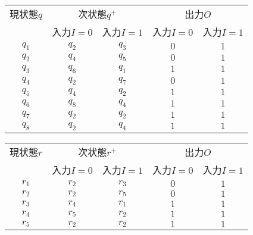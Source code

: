 \documentclass{jsarticle}
\begin{document}
\begin{tabular}{c|c|c||c|c}
\hline
現状態$q$  & \multicolumn{2}{c||}{次状態$q^{+}$} & \multicolumn{2}{c}{出力$O$} \\
\cline{2-5}  
   & 入力$I=0$ & 入力$I=1$ & 入力$I=0$ & 入力$I=1$\\
\hline
$q_{1}$ & $q_{2}$ & $q_{3}$ & $0$ & $1$ \\
$q_{2}$ & $q_{4}$ & $q_{5}$ & $0$ & $1$ \\
$q_{3}$ & $q_{6}$ & $q_{1}$ & $1$ & $1$ \\
$q_{4}$ & $q_{2}$ & $q_{7}$ & $0$ & $1$ \\
$q_{5}$ & $q_{4}$ & $q_{2}$ & $1$ & $1$ \\
$q_{6}$ & $q_{8}$ & $q_{4}$ & $1$ & $1$ \\
$q_{7}$ & $q_{2}$ & $q_{2}$ & $1$ & $1$ \\
$q_{8}$ & $q_{2}$ & $q_{4}$ & $1$ & $1$ \\
\hline
\end{tabular}
\newpage
\begin{tabular}{c|c|c||c|c}
\hline
現状態$r$  & \multicolumn{2}{c||}{次状態$r^{+}$} & \multicolumn{2}{c}{出力$O$} \\
\cline{2-5}  
   & 入力$I=0$ & 入力$I=1$ & 入力$I=0$ & 入力$I=1$\\
\hline
$r_{1}$ & $r_{2}$ & $r_{3}$ & $0$ & $1$ \\
$r_{2}$ & $r_{2}$ & $r_{5}$ & $0$ & $1$ \\
$r_{3}$ & $r_{4}$ & $r_{1}$ & $1$ & $1$ \\
$r_{4}$ & $r_{5}$ & $r_{2}$ & $1$ & $1$ \\
$r_{5}$ & $r_{2}$ & $r_{2}$ & $1$ & $1$ \\
\hline
\end{tabular}
\end{document}
